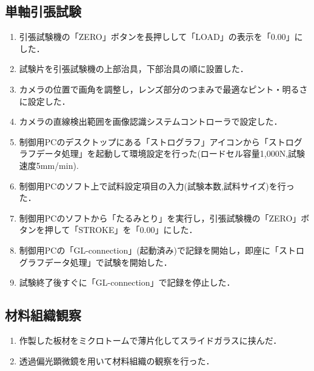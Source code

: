 \subsection{単軸引張試験}

\begin{enumerate}
    \item 引張試験機の「ZERO」ボタンを長押しして「LOAD」の表示を「0.00」にした．
    \item 試験片を引張試験機の上部治具，下部治具の順に設置した．
    \item カメラの位置で画角を調整し，レンズ部分のつまみで最適なピント・明るさに設定した．
    \item カメラの直線検出範囲を画像認識システムコントローラで設定した．
    \item 制御用PCのデスクトップにある「ストログラフ」アイコンから「ストログラフデータ処理」を起動して環境設定を行った(ロードセル容量1,000N,試験速度5mm/min).
    \item 制御用PCのソフト上で試料設定項目の入力(試験本数,試料サイズ)を行った．
    \item 制御用PCのソフトから「たるみとり」を実行し，引張試験機の「ZERO」ボタンを押して「STROKE」を「0.00」にした．
    \item 制御用PCの「GL-connection」(起動済み)で記録を開始し，即座に「ストログラフデータ処理」で試験を開始した．
    \item 試験終了後すぐに「GL-connection」で記録を停止した．
\end{enumerate}

\subsection{材料組織観察}

\begin{enumerate}
    \item 作製した板材をミクロトームで薄片化してスライドガラスに挟んだ．
    \item 透過偏光顕微鏡を用いて材料組織の観察を行った．
\end{enumerate}